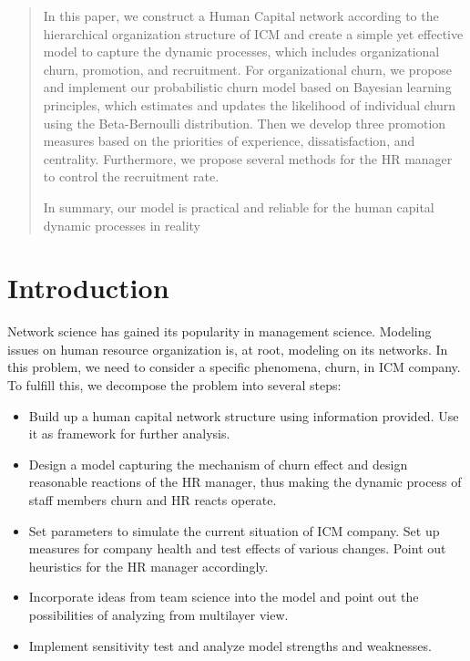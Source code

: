 \documentclass[tcn = 37075, sheet = false, abstract = false]{mcmthesis}
\begin{document}
\begin{abstract}
In this paper, we construct a Human Capital network according to the hierarchical organization structure of ICM and create a simple yet effective model to capture the dynamic processes, which includes organizational churn, promotion, and recruitment. For organizational churn, we propose and implement our probabilistic churn model based on Bayesian learning principles, which estimates and updates the likelihood of individual churn using the Beta-Bernoulli distribution. Then we develop three promotion measures based on the priorities of experience, dissatisfaction, and centrality. Furthermore, we propose several methods for the HR manager to control the recruitment rate.


In summary, our model is practical and reliable for the human capital dynamic processes in reality

\end{abstract}



\setcounter{tocdepth}{2}
\tableofcontents

\section{Introduction}

Network science has gained its popularity in management science. Modeling issues on human resource organization is, at root, modeling on its networks. In this problem, we need to consider a specific phenomena, churn, in  ICM company. To fulfill this, we decompose the problem into several steps:

\begin{itemize}
\item Build up a human capital network structure using information provided. Use it as framework for further analysis.
\item Design a model capturing the mechanism of churn effect and design reasonable reactions of the HR manager, thus making the dynamic process of staff members churn and HR reacts operate.
\item Set parameters to simulate the current situation of ICM company. Set up measures for company health and test effects of various changes. Point out heuristics for the HR manager accordingly.
\item Incorporate ideas from team science into the model and point out the possibilities of analyzing from multilayer view.
\item Implement sensitivity test and analyze model strengths and weaknesses.
\end{itemize}
\end{document}
